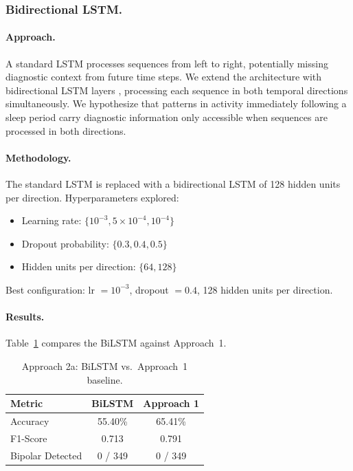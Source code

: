 \subsubsection{Bidirectional LSTM.}

\paragraph{Approach.}
A standard LSTM processes sequences from left to right, potentially missing diagnostic context from future time steps. We extend the architecture with bidirectional LSTM layers \cite{graves2005bilstm}, processing each sequence in both temporal directions simultaneously. We hypothesize that patterns in activity immediately following a sleep period carry diagnostic information only accessible when sequences are processed in both directions.

\paragraph{Methodology.}
The standard LSTM is replaced with a bidirectional LSTM of 128 hidden units per direction. Hyperparameters explored:
\begin{itemize}[nosep]
  \item Learning rate: $\{10^{-3}, 5 \times 10^{-4}, 10^{-4}\}$
  \item Dropout probability: $\{0.3, 0.4, 0.5\}$
  \item Hidden units per direction: $\{64, 128\}$
\end{itemize}
Best configuration: lr $= 10^{-3}$, dropout $= 0.4$, 128 hidden units per direction.

\paragraph{Results.}
Table~\ref{tab:approach2a_results} compares the BiLSTM against Approach~1.

\begin{table}[H]
\centering
\caption{Approach 2a: BiLSTM vs.\ Approach~1 baseline.}
\label{tab:approach2a_results}
\begin{tabular}{lcc}
\toprule
\textbf{Metric} & \textbf{BiLSTM} & \textbf{Approach 1} \\
\midrule
Accuracy & 55.40\% & 65.41\% \\
F1-Score & 0.713 & 0.791 \\
Bipolar Detected & 0 / 349 & 0 / 349 \\
\bottomrule
\end{tabular}
\end{table}

